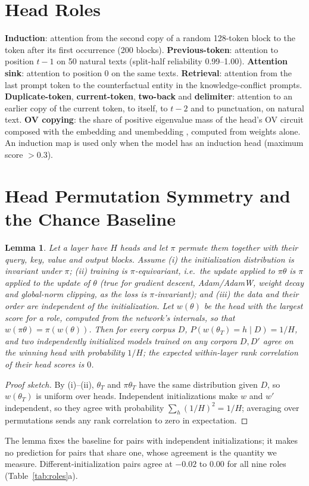 \documentclass[11pt]{article}
\newtheorem{lemma}{Lemma}
\begin{document}
\section{Head Roles}
\label{app:roles}
\textbf{Induction}: attention from the second copy of a random 128-token block to the token after its first occurrence (200 blocks).
\textbf{Previous-token}: attention to position $t-1$ on 50 natural texts (split-half reliability 0.99--1.00).
\textbf{Attention sink}: attention to position 0 on the same texts.
\textbf{Retrieval}: attention from the last prompt token to the counterfactual entity in the knowledge-conflict prompts.
\textbf{Duplicate-token}, \textbf{current-token}, \textbf{two-back} and \textbf{delimiter}: attention to an earlier copy of the current token, to itself, to $t-2$ and to punctuation, on natural text.
\textbf{OV copying}: the share of positive eigenvalue mass of the head's OV circuit composed with the embedding and unembedding \citep{elhage2021mathematical}, computed from weights alone.
An induction map is used only when the model has an induction head (maximum score $> 0.3$).

\section{Head Permutation Symmetry and the Chance Baseline}
\label{app:lemma}
\begin{lemma}
\label{lem:symmetry}
Let a layer have $H$ heads and let $\pi$ permute them together with their query, key, value and output blocks.
Assume (i) the initialization distribution is invariant under $\pi$; (ii) training is $\pi$-equivariant, i.e.\ the update applied to $\pi\theta$ is $\pi$ applied to the update of $\theta$ (true for gradient descent, Adam/AdamW, weight decay and global-norm clipping, as the loss is $\pi$-invariant); and (iii) the data and their order are independent of the initialization.
Let $w(\theta)$ be the head with the largest score for a role, computed from the network's internals, so that $w(\pi\theta) = \pi(w(\theta))$.
Then for every corpus $D$, $P(w(\theta_T) = h \mid D) = 1/H$, and two independently initialized models trained on any corpora $D, D'$ agree on the winning head with probability $1/H$; the expected within-layer rank correlation of their head scores is $0$.
\end{lemma}
\begin{proof}[Proof sketch]
By (i)--(ii), $\theta_T$ and $\pi\theta_T$ have the same distribution given $D$, so $w(\theta_T)$ is uniform over heads.
Independent initializations make $w$ and $w'$ independent, so they agree with probability $\sum_h (1/H)^2 = 1/H$; averaging over permutations sends any rank correlation to zero in expectation.
\end{proof}
The lemma fixes the baseline for pairs with independent initializations; it makes no prediction for pairs that share one, whose agreement is the quantity we measure.
Different-initialization pairs agree at $-0.02$ to $0.00$ for all nine roles (Table~\ref{tab:roles}a).
\end{document}
